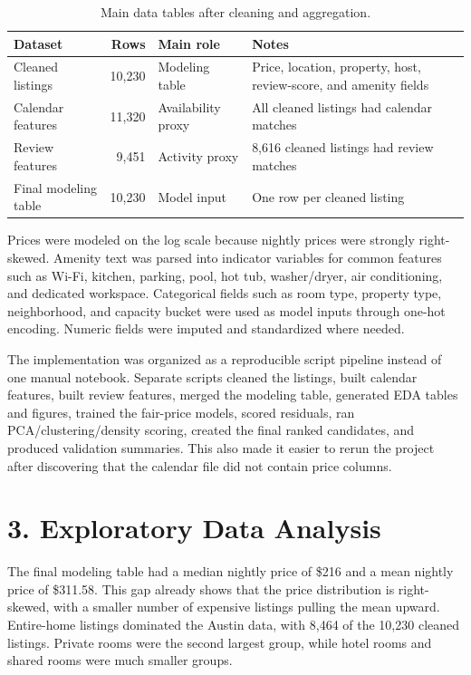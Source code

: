 \documentclass[11pt]{article}
\begin{document}
\begin{table}[H]
\centering
\caption{Main data tables after cleaning and aggregation.}
\small
\begin{tabular}{L{0.20\textwidth}rL{0.18\textwidth}L{0.42\textwidth}}
\toprule
Dataset & Rows & Main role & Notes \\
\midrule
Cleaned listings & 10,230 & Modeling table & Price, location, property, host, review-score, and amenity fields \\
Calendar features & 11,320 & Availability proxy & All cleaned listings had calendar matches \\
Review features & 9,451 & Activity proxy & 8,616 cleaned listings had review matches \\
Final modeling table & 10,230 & Model input & One row per cleaned listing \\
\bottomrule
\end{tabular}
\end{table}

Prices were modeled on the log scale because nightly prices were strongly right-skewed. Amenity text was parsed into indicator variables for common features such as Wi-Fi, kitchen, parking, pool, hot tub, washer/dryer, air conditioning, and dedicated workspace. Categorical fields such as room type, property type, neighborhood, and capacity bucket were used as model inputs through one-hot encoding. Numeric fields were imputed and standardized where needed.

The implementation was organized as a reproducible script pipeline instead of one manual notebook. Separate scripts cleaned the listings, built calendar features, built review features, merged the modeling table, generated EDA tables and figures, trained the fair-price models, scored residuals, ran PCA/clustering/density scoring, created the final ranked candidates, and produced validation summaries. This also made it easier to rerun the project after discovering that the calendar file did not contain price columns.

\section*{3. Exploratory Data Analysis}

The final modeling table had a median nightly price of \$216 and a mean nightly price of \$311.58. This gap already shows that the price distribution is right-skewed, with a smaller number of expensive listings pulling the mean upward. Entire-home listings dominated the Austin data, with 8,464 of the 10,230 cleaned listings. Private rooms were the second largest group, while hotel rooms and shared rooms were much smaller groups.
\end{document}
